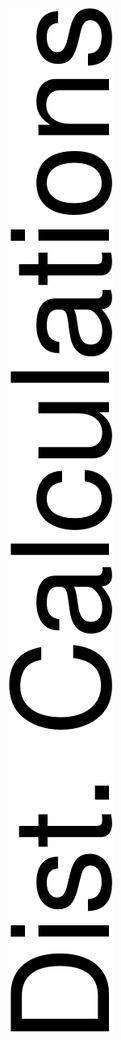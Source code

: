 \begin{figure}[htp]
	\captionsetup{justification=centering}
	\centering	
 		\begin{subfigure}{0.018\columnwidth}
			\centering
			\captionsetup{justification=centering}	
			\includegraphics[width=\textwidth]{img/Experiments/EP/dc.png}

\end{subfigure}
\end{figure}
